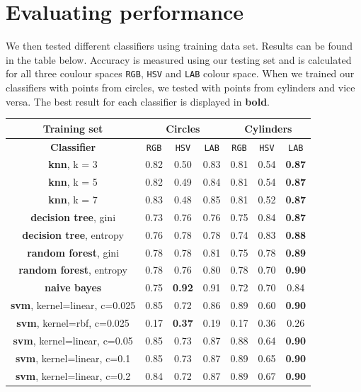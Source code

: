 \documentclass[12pt,a4paper]{article}
\begin{document}
	\section{Evaluating performance}

	We then tested different classifiers using training data set. Results can be found in the table below. Accuracy is measured using our testing set and is calculated for all three coulour spaces \texttt{RGB}, \texttt{HSV} and \texttt{LAB} colour space. When we trained our classifiers with points from circles, we tested with points from cylinders and vice versa. The best result for each classifier is displayed in \textbf{bold}.
	
	\begin{center}
		\begin{tabular}{|c|c|c|c||c|c|c|}
			\hline
			Training set & \multicolumn{3}{c||}{\textbf{Circles}} & \multicolumn{3}{c|}{\textbf{Cylinders}} \\
			\hline
			\hline 
			\textbf{Classifier} & \texttt{RGB} & \texttt{HSV} & \texttt{LAB} & \texttt{RGB} & \texttt{HSV} & \texttt{LAB} \\
			\hline
			\textbf{knn}, \small k = 3 & 0.82 & 0.50 & 0.83 & 0.81 & 0.54 & \textbf{0.87} \\ \hline
			\textbf{knn}, \small k = 5 & 0.82 & 0.49 & 0.84 & 0.81 & 0.54 & \textbf{0.87} \\ \hline
			\textbf{knn}, \small k = 7 & 0.83 & 0.48 & 0.85 & 0.81 & 0.52 & \textbf{0.87} \\ \hline
			\hline
			\textbf{decision tree}, \small gini & 0.73 & 0.76 & 0.76 & 0.75 & 0.84 & \textbf{0.87} \\ \hline
			\textbf{decision tree}, \small entropy & 0.76 & 0.78 & 0.78 & 0.74 & 0.83 & \textbf{0.88} \\ \hline
			\hline
			\textbf{random forest}, \small gini & 0.78 & 0.78 & 0.81 & 0.75 & 0.78 & \textbf{0.89} \\ \hline
			\textbf{random forest}, \small entropy & 0.78 & 0.76 & 0.80 & 0.78 & 0.70 & \textbf{0.90} \\ \hline
			\hline
			\textbf{naive bayes} & 0.75 & \textbf{0.92} & 0.91 & 0.72 & 0.70 & 0.84 \\ \hline
			\hline
			\textbf{svm}, \small kernel=linear, c=0.025 & 0.85 & 0.72 & 0.86 & 0.89 & 0.60 & \textbf{0.90} \\ \hline
			\textbf{svm}, \small kernel=rbf, c=0.025 & 0.17 & \textbf{0.37} & 0.19 & 0.17 & 0.36 & 0.26 \\ \hline
			\textbf{svm}, \small kernel=linear, c=0.05 & 0.85 & 0.73 & 0.87 & 0.88 & 0.64 & \textbf{0.90} \\ \hline
			\textbf{svm}, \small kernel=linear, c=0.1 & 0.85 & 0.73 & 0.87 & 0.89 & 0.65 & \textbf{0.90} \\ \hline
			\textbf{svm}, \small kernel=linear, c=0.2 & 0.84 & 0.72 & 0.87 & 0.89 & 0.67 & \textbf{0.90} \\ \hline
		\end{tabular} \\
	\end{center}
\end{document}
